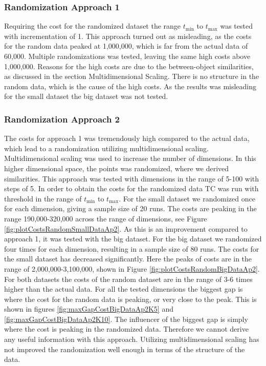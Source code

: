 \documentclass[a4paper,10pt]{article}
\theoremstyle{plain}
\theoremstyle{definition}
\begin{document}
\subsubsection{Randomization Approach 1}
Requiring the cost for the randomized dataset the range $t_{\min}$ to $t_{\max}$ was tested with incrementation of 1. This approach turned out as misleading, as the costs for the random data peaked at 1,000,000, which is far from the actual data of 60,000. Multiple randomizations was tested, leaving the same high costs above 1,000,000. Reasons for the high costs are due to the between-object similarities, as discussed in the section Multidimensional Scaling. There is no structure in the random data, which is the cause of the high costs. As the results was misleading for the small dataset the big dataset was not tested.


\subsubsection{Randomization Approach 2}
The costs for approach 1 was tremendously high compared to the actual data, which lead to a randomization utilizing multidimensional scaling. Multidimensional scaling was used to increase the number of dimensions. In this higher dimensional space, the points was randomized, where we derived similarities. This approach was tested with dimensions in the range of 5-100 with steps of 5. In order to obtain the costs for the randomized data TC was run with threshold in the range of $t_{\min}$ to $t_{\max}$. 
For the small dataset we randomized once for each dimension, giving a sample size of 20 runs. The costs are peaking in the range 190,000-320,000 across the range of dimensions, see Figure \ref{fig:plotCostsRandomSmallDataAp2}. As this is an improvement compared to approach 1, it was tested with the big dataset. For the big dataset we randomized four times for each dimension, resulting in a sample size of 80 runs. The costs for the small dataset has decreased significantly. Here the peaks of costs are in the range of 2,000,000-3,100,000, shown in Figure \ref{fig:plotCostsRandomBigDataAp2}. For both datasets the costs of the random dataset are in the range of 3-6 times higher than the actual data. For all the tested dimensions the biggest gap is where the cost for the random data is peaking, or very close to the peak. This is shown in figures \ref{fig:maxGapCostBigDataAp2K5} and \ref{fig:maxGapCostBigDataAp2K10}. The influencer of the biggest gap is simply where the cost is peaking in the randomized data. Therefore we cannot derive any useful information with this approach. Utilizing multidimensional scaling has not improved the randomization well enough in terms of the structure of the data.
\end{document}
